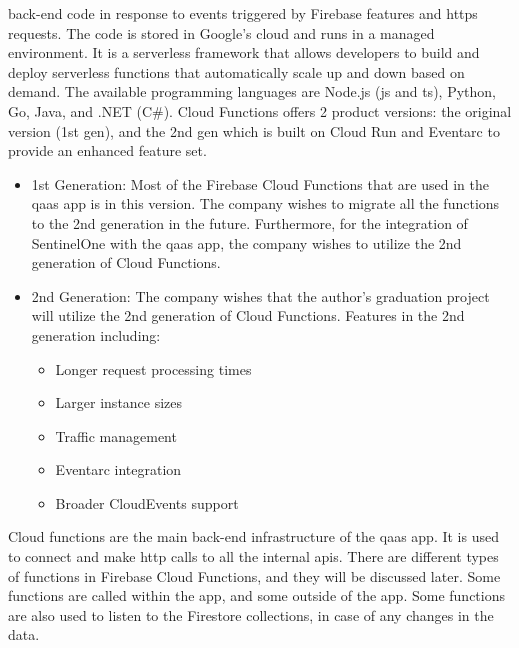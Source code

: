 \begin{multicols}{2}
\begin{itemize}
                  back-end code in response to events triggered by Firebase features and \acrshort{https} requests.
                  The code is stored in Google's cloud and runs in a managed environment. It is a serverless framework
                  that allows developers to build and deploy serverless functions that automatically scale up and down
                  based on demand. The available programming languages are Node.js (\acrshort{js} and \acrshort{ts}),
                  Python, Go, Java, and .NET (C\#). Cloud Functions offers 2 product versions: the original version
                  (1st gen), and the 2nd gen which is built on Cloud Run and Eventarc to provide an enhanced feature set.
                  \begin{itemize}
                        \item 1st Generation: Most of the Firebase Cloud Functions that are used in the \acrshort{qaas} app
                              is in this version. The company wishes to migrate all the functions to the 2nd generation in
                              the future. Furthermore, for the integration of SentinelOne with the \acrshort{qaas} app, the
                              company wishes to utilize the 2nd generation of Cloud Functions.
                        \item 2nd Generation: The company wishes that the author's graduation project will utilize the 2nd
                              generation of Cloud Functions. Features in the 2nd generation including:
                              \begin{itemize}
                                    \item Longer request processing times
                                    \item Larger instance sizes
                                    \item Traffic management
                                    \item Eventarc integration
                                    \item Broader CloudEvents support
                              \end{itemize}
                  \end{itemize}
                  Cloud functions are the main back-end infrastructure of the \acrshort{qaas} app. It is used to connect
                  and make \acrshort{http} calls to all the internal \acrshort{api}s. There are different types of
                  functions in Firebase Cloud Functions, and they will be discussed later. Some functions are called within
                  the app, and some outside of the app. Some functions are also used to listen to the Firestore collections,
                  in case of any changes in the data.
      \end{itemize}
\end{multicols}

